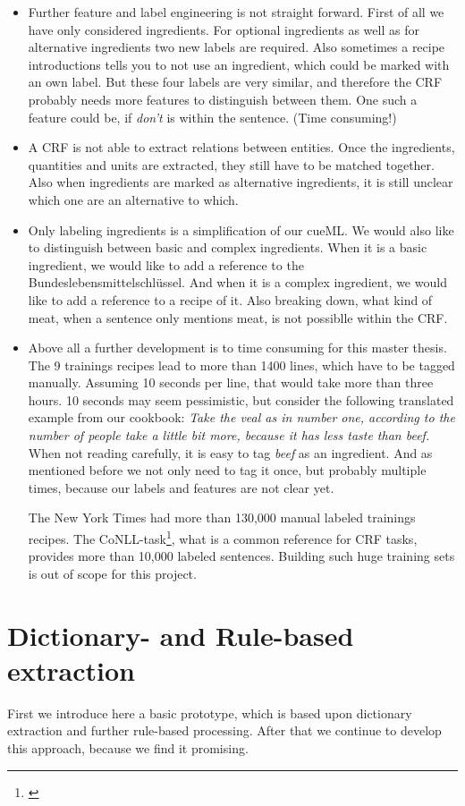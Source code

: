 \documentclass[12pt, twoside]{report}
\begin{document}
\begin{itemize}
	\item Further feature and label engineering is not straight forward. First of all we have only considered ingredients. For optional ingredients as well as for alternative ingredients two new labels are required. Also sometimes a recipe introductions tells you to not use an ingredient, which could be marked with an own label. But these four
	labels are very similar, and therefore the CRF probably needs more features to distinguish between them. One such a feature could be, if \textit{don't} is within the sentence.
	(Time consuming!)
	\item A CRF is not able to extract relations between entities. Once the ingredients, quantities and units are extracted, they still have to be matched together. Also when ingredients are marked as alternative ingredients, it is still unclear which one are an alternative to which.
	\item Only labeling ingredients is a simplification of our cueML. We would also like to distinguish between basic and complex ingredients. When it is a basic ingredient, we would like to add a reference to the Bundeslebensmittelschlüssel. And when it is a complex ingredient, we would like to add a reference to a recipe of it. Also breaking down, what kind of meat, when a sentence only mentions meat, is not possiblle within the CRF.
	\item Above all a further development is to time consuming for this master thesis. The 9 trainings recipes lead to more than 1400 lines, which have to be tagged manually. Assuming 10 seconds per line, that would take more than three hours. 10 seconds may seem pessimistic, but consider the following translated example from our cookbook: \textit{Take the veal as in number one, according to the number of people take a little bit more, because it has less taste than beef.} When not reading carefully, it is easy to tag \textit{beef} as an ingredient. And as mentioned before we not only need to tag it once, but probably multiple times, because our labels and features are not clear yet.
	
	The New York Times had more than 130,000 manual labeled trainings recipes. The CoNLL-task\footnote{\parencite{TjongKimSang2003}}, what is a common reference for CRF tasks, provides more than 10,000 labeled sentences. Building such huge training sets is out of scope for this project.
\end{itemize}


\chapter{Dictionary- and Rule-based extraction}
First we introduce here a basic prototype, which is based upon dictionary extraction and further rule-based processing. After that we continue to develop this approach, because we find it promising.
\end{document}
